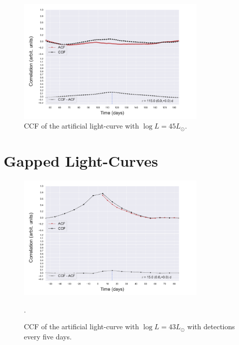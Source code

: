 \documentclass[letterpaper, oneside]{article}
\begin{document}
\begin{figure}[p]
	\centering
	\includegraphics[width=0.8\textwidth]{../x_y_bands_45_final.pdf}
	\caption{CCF of the artificial light-curve with $\log L = 45 L_{\odot}$.}
	\label{fig:ccf_art_lcs_L45}
\end{figure}



\section{Gapped Light-Curves}

\begin{figure}[h]
	\centering
	\includegraphics[width=0.8\textwidth]{../artificial_x_y_5days.pdf}
	\caption{CCF of the artificial light-curve with $\log L = 43 L_{\odot}$ with detections every five days.}.
	\label{fig:ccf_art_lc_L43_5days}
\end{figure}
\end{document}
